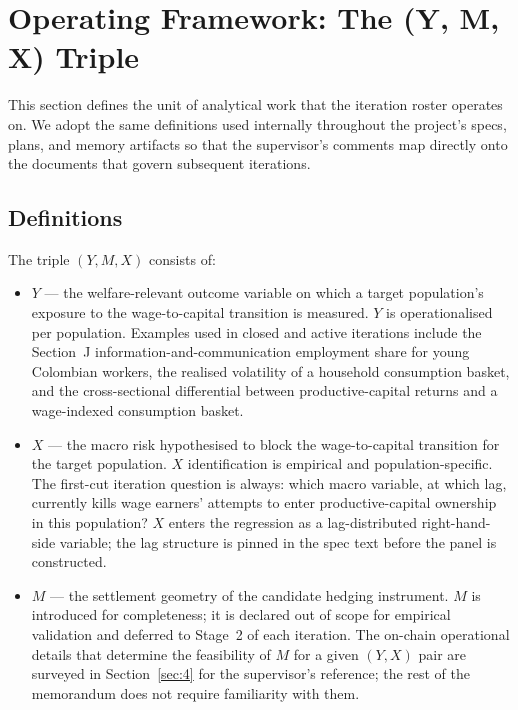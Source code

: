 \section{Operating Framework: The (Y, M, X) Triple}\label{sec:2}

This section defines the unit of analytical work that the iteration roster
operates on. We adopt the same definitions used internally throughout the
project's specs, plans, and memory artifacts so that the supervisor's
comments map directly onto the documents that govern subsequent iterations.

\subsection{Definitions}

The triple \((Y, M, X)\) consists of:

\begin{itemize}
  \item \(Y\) — the welfare-relevant outcome variable on which a target
    population's exposure to the wage-to-capital transition is measured.
    \(Y\) is operationalised per population. Examples used in closed and
    active iterations include the Section~J information-and-communication
    employment share for young Colombian workers, the realised volatility
    of a household consumption basket, and the cross-sectional differential
    between productive-capital returns and a wage-indexed consumption
    basket.
  \item \(X\) — the macro risk hypothesised to block the wage-to-capital
    transition for the target population. \(X\) identification is empirical
    and population-specific. The first-cut iteration question is always:
    which macro variable, at which lag, currently kills wage earners'
    attempts to enter productive-capital ownership in this population? \(X\)
    enters the regression as a lag-distributed right-hand-side variable;
    the lag structure is pinned in the spec text before the panel is
    constructed.
  \item \(M\) — the settlement geometry of the candidate hedging
    instrument. \(M\) is introduced for completeness; it is declared out of
    scope for empirical validation and deferred to Stage~2 of each
    iteration. The on-chain operational details that determine the
    feasibility of \(M\) for a given \((Y, X)\) pair are surveyed in
    Section~\ref{sec:4} for the supervisor's reference; the rest of the
    memorandum does not require familiarity with them.
\end{itemize}

